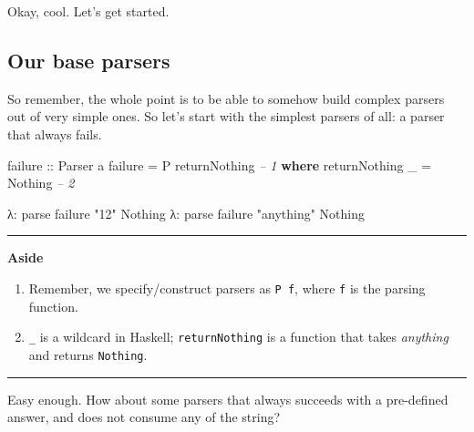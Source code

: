 \documentclass[]{article}
\newenvironment{Shaded}{}{}
\newcommand{\KeywordTok}[1]{\textcolor[rgb]{0.00,0.44,0.13}{\textbf{{#1}}}}
\newcommand{\DataTypeTok}[1]{\textcolor[rgb]{0.56,0.13,0.00}{{#1}}}
\newcommand{\StringTok}[1]{\textcolor[rgb]{0.25,0.44,0.63}{{#1}}}
\newcommand{\CommentTok}[1]{\textcolor[rgb]{0.38,0.63,0.69}{\textit{{#1}}}}
\newcommand{\OtherTok}[1]{\textcolor[rgb]{0.00,0.44,0.13}{{#1}}}
\newcommand{\FunctionTok}[1]{\textcolor[rgb]{0.02,0.16,0.49}{{#1}}}
\newcommand{\NormalTok}[1]{{#1}}
\begin{document}
Okay, cool. Let's get started.

\subsection{Our base parsers}\label{our-base-parsers}

So remember, the whole point is to be able to somehow build complex
parsers out of very simple ones. So let's start with the simplest
parsers of all: a parser that always fails.

\begin{Shaded}
\begin{Highlighting}[]
\OtherTok{failure ::} \DataTypeTok{Parser} \NormalTok{a}
\NormalTok{failure }\FunctionTok{=} \DataTypeTok{P} \NormalTok{returnNothing                   }\CommentTok{-- 1}
    \KeywordTok{where}
        \NormalTok{returnNothing _ }\FunctionTok{=} \DataTypeTok{Nothing}           \CommentTok{-- 2}
\end{Highlighting}
\end{Shaded}

\begin{Shaded}
\begin{Highlighting}[]
\NormalTok{λ}\FunctionTok{:} \NormalTok{parse failure }\StringTok{"12"}
\DataTypeTok{Nothing}
\NormalTok{λ}\FunctionTok{:} \NormalTok{parse failure }\StringTok{"anything"}
\DataTypeTok{Nothing}
\end{Highlighting}
\end{Shaded}

\begin{center}\rule{0.5\linewidth}{\linethickness}\end{center}

\textbf{Aside}

\begin{enumerate}
\def\labelenumi{\arabic{enumi}.}
\tightlist
\item
  Remember, we specify/construct parsers as \texttt{P\ f}, where
  \texttt{f} is the parsing function.
\item
  \texttt{\_} is a wildcard in Haskell; \texttt{returnNothing} is a
  function that takes \emph{anything} and returns \texttt{Nothing}.
\end{enumerate}

\begin{center}\rule{0.5\linewidth}{\linethickness}\end{center}

Easy enough. How about some parsers that always succeeds with a
pre-defined answer, and does not consume any of the string?
\end{document}
